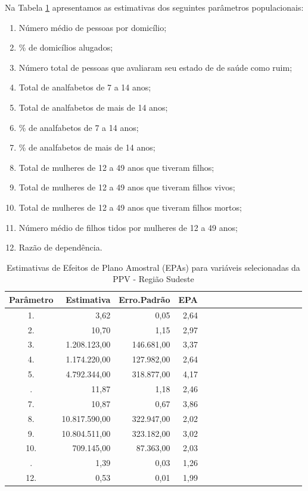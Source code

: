 \documentclass[]{book}
\providecommand{\tightlist}{%
  \setlength{\itemsep}{0pt}\setlength{\parskip}{0pt}}
\theoremstyle{definition}
\theoremstyle{definition}
\theoremstyle{definition}
\theoremstyle{remark}
\begin{document}
Na Tabela \ref{tab:epas} apresentamos as estimativas dos seguintes
parâmetros populacionais:

\begin{enumerate}
\def\labelenumi{\arabic{enumi}.}
\tightlist
\item
  Número médio de pessoas por domicílio;
\item
  \% de domicílios alugados;
\item
  Número total de pessoas que avaliaram seu estado de de saúde como
  ruim;
\item
  Total de analfabetos de 7 a 14 anos;
\item
  Total de analfabetos de mais de 14 anos;
\item
  \% de analfabetos de 7 a 14 anos;
\item
  \% de analfabetos de mais de 14 anos;
\item
  Total de mulheres de 12 a 49 anos que tiveram filhos;
\item
  Total de mulheres de 12 a 49 anos que tiveram filhos vivos;
\item
  Total de mulheres de 12 a 49 anos que tiveram filhos mortos;
\item
  Número médio de filhos tidos por mulheres de 12 a 49 anos;
\item
  Razão de dependência.
\end{enumerate}

\begin{table}

\caption{\label{tab:epas}Estimativas de Efeitos de Plano Amostral (EPAs)
para variáveis selecionadas da PPV - Região Sudeste}
\centering
\begin{tabular}[t]{crrrcrrrcrrrcrrr}
\toprule
Parâmetro & Estimativa & Erro.Padrão & EPA\\
\midrule
1. & 3,62 & 0,05 & 2,64\\
2. & 10,70 & 1,15 & 2,97\\
3. & 1.208.123,00 & 146.681,00 & 3,37\\
4. & 1.174.220,00 & 127.982,00 & 2,64\\
5. & 4.792.344,00 & 318.877,00 & 4,17\\
\addlinespace
6. & 11,87 & 1,18 & 2,46\\
7. & 10,87 & 0,67 & 3,86\\
8. & 10.817.590,00 & 322.947,00 & 2,02\\
9. & 10.804.511,00 & 323.182,00 & 3,02\\
10. & 709.145,00 & 87.363,00 & 2,03\\
\addlinespace
11. & 1,39 & 0,03 & 1,26\\
12. & 0,53 & 0,01 & 1,99\\
\bottomrule
\end{tabular}
\end{table}
\end{document}
